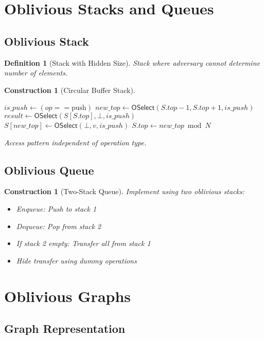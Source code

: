 \documentclass[11pt,final]{article}
\newtheorem{definition}[theorem]{Definition}
\newtheorem{construction}[theorem]{Construction}
\begin{document}
\section{Oblivious Stacks and Queues}

\subsection{Oblivious Stack}

\begin{definition}[Stack with Hidden Size]
Stack where adversary cannot determine number of elements.
\end{definition}

\begin{construction}[Circular Buffer Stack]
\begin{algorithm}[H]
\caption{Oblivious Stack Push/Pop}
$is\_push \gets (op == \text{push})$\;
$new\_top \gets \mathsf{OSelect}(S.top - 1, S.top + 1, is\_push)$\;
$result \gets \mathsf{OSelect}(S[S.top], \bot, is\_push)$\;
$S[new\_top] \gets \mathsf{OSelect}(\bot, v, is\_push)$\;
$S.top \gets new\_top \bmod N$\;
\end{algorithm}
Access pattern independent of operation type.
\end{construction}

\subsection{Oblivious Queue}

\begin{construction}[Two-Stack Queue]
Implement using two oblivious stacks:
\begin{itemize}
    \item Enqueue: Push to stack 1
    \item Dequeue: Pop from stack 2
    \item If stack 2 empty: Transfer all from stack 1
    \item Hide transfer using dummy operations
\end{itemize}
\end{construction}

\section{Oblivious Graphs}

\subsection{Graph Representation}
\end{document}
